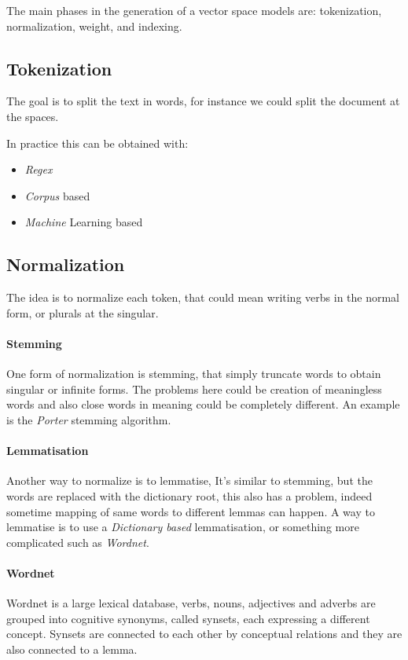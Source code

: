 The main phases in the generation of a vector space models are:
tokenization, normalization, weight, and indexing.

\subsection{Tokenization}
The goal is to split the text in words, for instance we could split the
document at the spaces.

In practice this can be obtained with:
\begin{itemize}
    \item \emph{Regex}
    \item \emph{Corpus} based
    \item \emph{Machine} Learning based
\end{itemize}

\subsection{Normalization}
\label{normalization}
The idea is to normalize each token, that could mean writing verbs in the normal 
form, or plurals at the singular.

\paragraph{Stemming}
One form of normalization is stemming, that simply truncate words 
to obtain singular or infinite forms.
The problems here could be creation of meaningless words and also 
close words in meaning could be completely different. An example
is the \emph{Porter} stemming algorithm.

\paragraph{Lemmatisation}
Another way to normalize is to lemmatise, 
It's similar to stemming, but the words are replaced with the dictionary 
root, this also has a problem, indeed sometime mapping of same words to 
different lemmas can happen. A way to lemmatise is to use a 
\emph{Dictionary based} lemmatisation, or something more complicated 
such as \emph{Wordnet}.

\paragraph{Wordnet}
Wordnet is a large lexical database, verbs, nouns, adjectives and adverbs are
grouped into cognitive synonyms, called synsets, each expressing
a different concept.
Synsets are connected to each other by conceptual relations and they are also 
connected to a lemma.


